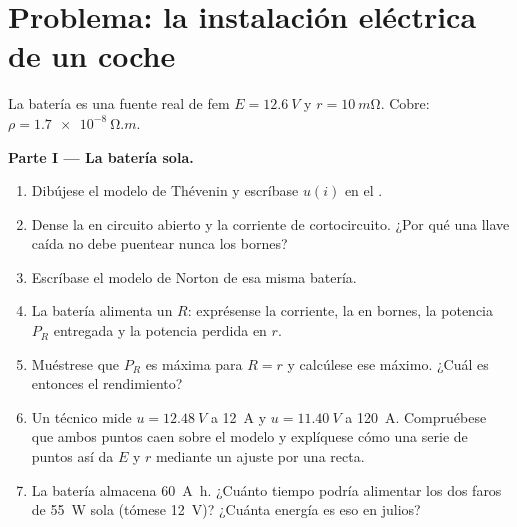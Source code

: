 \section{Problema: la instalación eléctrica de un coche}

\begin{problem}
\label{pb:b1:dc-circuits:1}
La batería es una fuente real de fem $E = \qty{12.6}{V}$ y  $r = \qty{10}{m\ohm}$. Cobre: $\rho = \qty{1.7e-8}{\ohm.m}$.

\medskip
\noindent\textbf{Parte I --- La batería sola.}
\begin{enumerate}
  \item Dibújese el modelo de Thévenin y escríbase $u(i)$ en el .
  \item Dense la  en circuito abierto y la corriente de
        cortocircuito. ¿Por qué una llave caída no debe puentear nunca los
        bornes?
  \item Escríbase el modelo de Norton de esa misma batería.
  \item La batería alimenta un  $R$: exprésense la corriente, la
         en bornes, la potencia $P_R$ entregada y la potencia
        perdida en $r$.
  \item Muéstrese que $P_R$ es máxima para $R = r$ y calcúlese ese
        máximo. ¿Cuál es entonces el rendimiento?
  \item Un técnico mide $u = \qty{12.48}{V}$ a \qty{12}{A} y
        $u = \qty{11.40}{V}$ a \qty{120}{A}. Compruébese que ambos puntos
        caen sobre el modelo y explíquese cómo una serie de puntos así da
        $E$ y $r$ mediante un ajuste por una recta.
  \item La batería almacena \qty{60}{A.h}. ¿Cuánto tiempo podría
        alimentar los dos faros de \qty{55}{W} sola (tómese \qty{12}{V})?
        ¿Cuánta energía es eso en julios?
\end{enumerate}


\end{problem}
